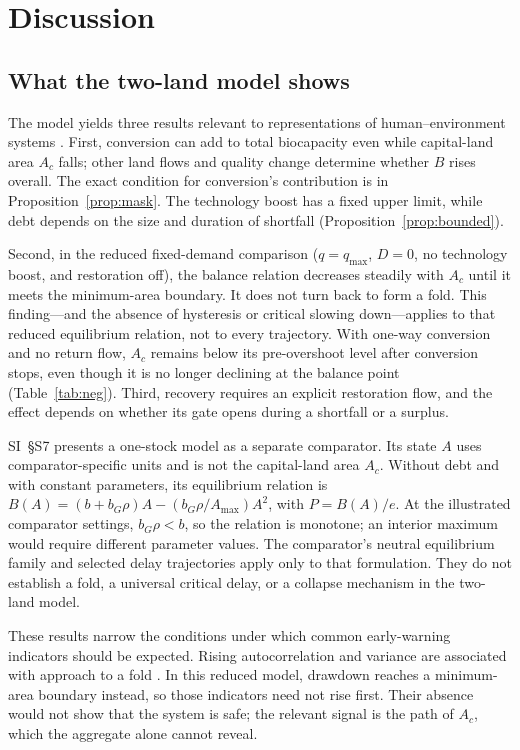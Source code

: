 \clearpage
\section{Discussion}\label{sec:discussion}

\subsection{What the two-land model shows}

The model yields three results relevant to representations of human--environment systems \citep{Schaefer1954,May1973,Meadows1972,Meadows2004,WackernagelRees1996,BranderTaylor1998}. First, conversion can add to total biocapacity even while capital-land area $A_c$ falls; other land flows and quality change determine whether $B$ rises overall. The exact condition for conversion's contribution is in Proposition~\ref{prop:mask}. The technology boost has a fixed upper limit, while debt depends on the size and duration of shortfall (Proposition~\ref{prop:bounded}).

Second, in the reduced fixed-demand comparison ($q=q_{\max}$, $D=0$, no technology boost, and restoration off), the balance relation decreases steadily with $A_c$ until it meets the minimum-area boundary. It does not turn back to form a fold. This finding—and the absence of hysteresis or critical slowing down—applies to that reduced equilibrium relation, not to every trajectory. With one-way conversion and no return flow, $A_c$ remains below its pre-overshoot level after conversion stops, even though it is no longer declining at the balance point (Table~\ref{tab:neg}). Third, recovery requires an explicit restoration flow, and the effect depends on whether its gate opens during a shortfall or a surplus.

SI~\S S7 presents a one-stock model as a separate comparator. Its state $A$ uses comparator-specific units and is not the capital-land area $A_c$. Without debt and with constant parameters, its equilibrium relation is $B(A)=(b+b_G\rho)A-(b_G\rho/A_{\max})A^2$, with $P=B(A)/e$. At the illustrated comparator settings, $b_G\rho<b$, so the relation is monotone; an interior maximum would require different parameter values. The comparator's neutral equilibrium family and selected delay trajectories apply only to that formulation. They do not establish a fold, a universal critical delay, or a collapse mechanism in the two-land model.

These results narrow the conditions under which common early-warning indicators should be expected. Rising autocorrelation and variance are associated with approach to a fold \citep{Scheffer2001}. In this reduced model, drawdown reaches a minimum-area boundary instead, so those indicators need not rise first. Their absence would not show that the system is safe; the relevant signal is the path of $A_c$, which the aggregate alone cannot reveal.


